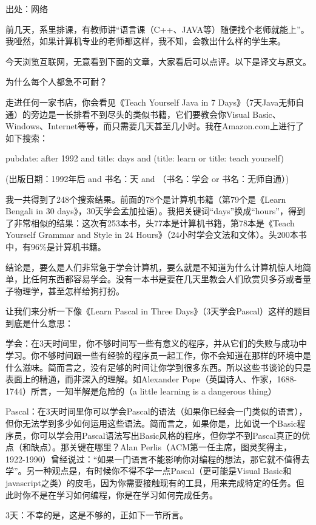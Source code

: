 出处：网络

	

前几天，系里排课，有教师讲“语言课（C++、JAVA等）随便找个老师就能上”。我哑然，如果计算机专业的老师都这样，我不知，会教出什么样的学生来。

今天浏览互联网，无意看到下面的文章，大家看后可以点评。以下是译文与原文。


为什么每个人都急不可耐？

走进任何一家书店，你会看见《Teach Yourself Java in 7 Days》（7天Java无师自通）的旁边是一长排看不到尽头的类似书籍，它们要教会你Visual Basic、Windows、Internet等等，而只需要几天甚至几小时。我在Amazon.com上进行了如下搜索：

pubdate: after 1992 and title: days and (title: learn or title: teach yourself)

(出版日期：1992年后 and 书名：天 and （书名：学会 or 书名：无师自通）)

我一共得到了248个搜索结果。前面的78个是计算机书籍（第79个是《Learn Bengali in 30 days》，30天学会孟加拉语）。我把关键词“days”换成“hours”，得到了非常相似的结果：这次有253本书，头77本是计算机书籍，第78本是《Teach Yourself Grammar and Style in 24 Hours》（24小时学会文法和文体）。头200本书中，有96\%是计算机书籍。

结论是，要么是人们非常急于学会计算机，要么就是不知道为什么计算机惊人地简单，比任何东西都容易学会。没有一本书是要在几天里教会人们欣赏贝多芬或者量子物理学，甚至怎样给狗打扮。

让我们来分析一下像《Learn Pascal in Three Days》（3天学会Pascal）这样的题目到底是什么意思：

\begin{compactitem}
\item 学会：在3天时间里，你不够时间写一些有意义的程序，并从它们的失败与成功中学习。你不够时间跟一些有经验的程序员一起工作，你不会知道在那样的环境中是什么滋味。简而言之，没有足够的时间让你学到很多东西。所以这些书谈论的只是表面上的精通，而非深入的理解。如Alexander Pope（英国诗人、作家，1688-1744）所言，一知半解是危险的（a little learning is a dangerous thing）
\item Pascal：在3天时间里你可以学会Pascal的语法（如果你已经会一门类似的语言），但你无法学到多少如何运用这些语法。简而言之，如果你是，比如说一个Basic程序员，你可以学会用Pascal语法写出Basic风格的程序，但你学不到Pascal真正的优点（和缺点）。那关键在哪里？Alan Perlis（ACM第一任主席，图灵奖得主，1922-1990）曾经说过：“如果一门语言不能影响你对编程的想法，那它就不值得去学”。另一种观点是，有时候你不得不学一点Pascal（更可能是Visual Basic和javascript之类）的皮毛，因为你需要接触现有的工具，用来完成特定的任务。但此时你不是在学习如何编程，你是在学习如何完成任务。
\item 3天：不幸的是，这是不够的，正如下一节所言。
\end{compactitem}

